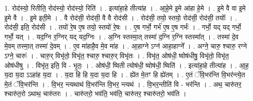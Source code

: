 \documentclass[17pt]{extarticle}
\begin{document}
1. रोद॑स्यो॒ रितीति॒ रोद॑स्यो॒ रोद॑स्यो॒ रिति॑ । . इत्या॑हा॒हे तीत्या॑ह । . आ॒हे॒मे इ॒मे आ॑हा हे॒मे । . इ॒मे वै वा इ॒मे इ॒मे वै । . इ॒मे इती॒मे । . वै रोद॑सी॒ रोद॑सी॒ वै वै रोद॑सी । . रोद॑सी॒ तयो॒ स्तयो॒ रोद॑सी॒ रोद॑सी॒ तयोः᳚ । . रोद॑सी॒ इति॒ रोद॑सी । . तयो॑ रे॒ष ए॒ष तयो॒ स्तयो॑ रे॒षः । . ए॒ष गर्भो॒ गर्भ॑ ए॒ष ए॒ष गर्भः॑ । . गर्भो॒ यद् यद् गर्भो॒ गर्भो॒ यत् । . यद॒ग्नि र॒ग्निर् यद् यद॒ग्निः । . अ॒ग्नि स्तस्मा॒त् तस्मा॑ द॒ग्नि र॒ग्नि स्तस्मा᳚त् । . तस्मा॑ दे॒व मे॒वम् तस्मा॒त् तस्मा॑ दे॒वम् । . ए॒व मा॑हाहै॒व मे॒व मा॑ह । . आ॒हाग्ने ऽग्न॑ आहा॒हाग्ने᳚ । . अग्ने॒ चारु॒ श्चारु॒ रग्ने ऽग्ने॒ चारुः॑ । . चारु॒र् विभृ॑तो॒ विभृ॑त॒ श्चारु॒ श्चारु॒र् विभृ॑तः । . विभृ॑त॒ ओष॑धी॒ ष्वोष॑धीषु॒ विभृ॑तो॒ विभृ॑त॒ ओष॑धीषु । . विभृ॑त॒ इति॒ वि - भृ॒तः॒ । . ओष॑धी॒ ष्विती त्योष॑धी॒ ष्वोष॑धी॒ ष्विति॑ । . इत्या॑हा॒हे तीत्या॑ह । . आ॒ह॒ य॒दा य॒दा ऽऽहा॑ह य॒दा । . य॒दा हि हि य॒दा य॒दा हि । . ह्ये॑त मे॒तꣳ हि ह्ये॑तम् । . ए॒तं ॅवि॒भर॑न्ति वि॒भर॑न्त्ये॒त मे॒तं ॅवि॒भर॑न्ति । . वि॒भर॒ न्त्यथाथ॑ वि॒भर॑न्ति वि॒भर॒ न्त्यथ॑ । . वि॒भर॒न्तीति॑ वि - भर॑न्ति । . अथ॒ चारु॑तर॒ श्चारु॑त॒रो ऽथाथ॒ चारु॑तरः । . चारु॑तरो॒ भव॑ति॒ भव॑ति॒ चारु॑तर॒ श्चारु॑तरो॒ भव॑ति । \newline
\end{document}
